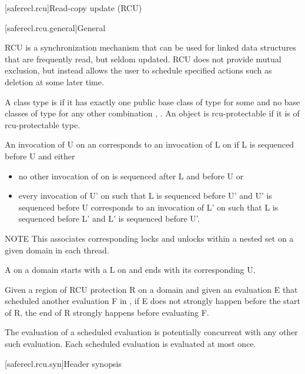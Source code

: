 
[saferecl.rcu]{Read-copy update (RCU)}

[saferecl.rcu.general]{General}

RCU is a synchronization mechanism that can be used for linked data
structures that are frequently read, but seldom updated. RCU does
not provide mutual exclusion, but instead allows the user to schedule
specified actions such as deletion at some later time.

A class type  is  if it has exactly one
public base class of type  for some 
and no base classes of type  for any other
combination , . An object is rcu-protectable if it is
of rcu-protectable type.

An invocation of  U on an  corresponds
to an invocation of  L on  if L is
sequenced before U and either

\begin{itemize}
\item	no other invocation of  on  is sequenced
	after L and before U or
\item	every invocation of  U' on  such
	that L is sequenced before U' and U'
	is sequenced before U corresponds to an invocation of
	 L' on  such that L is sequenced
	before L' and L' is sequenced before U'.
\end{itemize}

NOTE
This associates corresponding locks and unlocks within a nested set
on a given domain in each thread.

A  on a domain  starts
with a  L on  and ends with its corresponding
 U.

Given a region of RCU protection R on a domain 
and given an evaluation E that scheduled another evaluation
F in , if E does not strongly happen before
the start of R, the end of R strongly happens before
evaluating F.

The evaluation of a scheduled evaluation is potentially concurrent with
any other such evaluation. Each scheduled evaluation is evaluated at
most once.

[saferecl.rcu.syn]{Header  synopsis}

